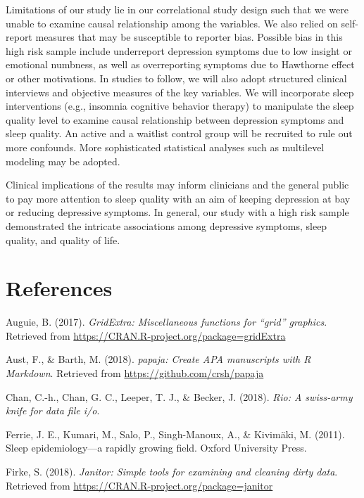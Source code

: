 \documentclass[man, noextraspace]{apa6}
\theoremstyle{definition}
\theoremstyle{definition}
\theoremstyle{definition}
\theoremstyle{remark}
\begin{document}
Limitations of our study lie in our correlational study design such that
we were unable to examine causal relationship among the variables. We
also relied on self-report measures that may be susceptible to reporter
bias. Possible bias in this high risk sample include underreport
depression symptoms due to low insight or emotional numbness, as well as
overreporting symptoms due to Hawthorne effect or other motivations. In
studies to follow, we will also adopt structured clinical interviews and
objective measures of the key variables. We will incorporate sleep
interventions (e.g., insomnia cognitive behavior therapy) to manipulate
the sleep quality level to examine causal relationship between
depression symptoms and sleep quality. An active and a waitlist control
group will be recruited to rule out more confounds. More sophisticated
statistical analyses such as multilevel modeling may be adopted.

Clinical implications of the results may inform clinicians and the
general public to pay more attention to sleep quality with an aim of
keeping depression at bay or reducing depressive symptoms. In general,
our study with a high risk sample demonstrated the intricate
associations among depressive symptoms, sleep quality, and quality of
life.

\newpage

\section{References}\label{references}

\begingroup
\setlength{\parindent}{-0.5in} \setlength{\leftskip}{0.5in}

\hypertarget{refs}{}
\hypertarget{ref-R-gridExtra}{}
Auguie, B. (2017). \emph{GridExtra: Miscellaneous functions for ``grid''
graphics}. Retrieved from
\url{https://CRAN.R-project.org/package=gridExtra}

\hypertarget{ref-R-papaja}{}
Aust, F., \& Barth, M. (2018). \emph{papaja: Create APA manuscripts with
R Markdown}. Retrieved from \url{https://github.com/crsh/papaja}

\hypertarget{ref-R-rio}{}
Chan, C.-h., Chan, G. C., Leeper, T. J., \& Becker, J. (2018).
\emph{Rio: A swiss-army knife for data file i/o}.

\hypertarget{ref-ferrie2011sleep}{}
Ferrie, J. E., Kumari, M., Salo, P., Singh-Manoux, A., \& Kivimäki, M.
(2011). Sleep epidemiology---a rapidly growing field. Oxford University
Press.

\hypertarget{ref-R-janitor}{}
Firke, S. (2018). \emph{Janitor: Simple tools for examining and cleaning
dirty data}. Retrieved from
\url{https://CRAN.R-project.org/package=janitor}
\end{document}
